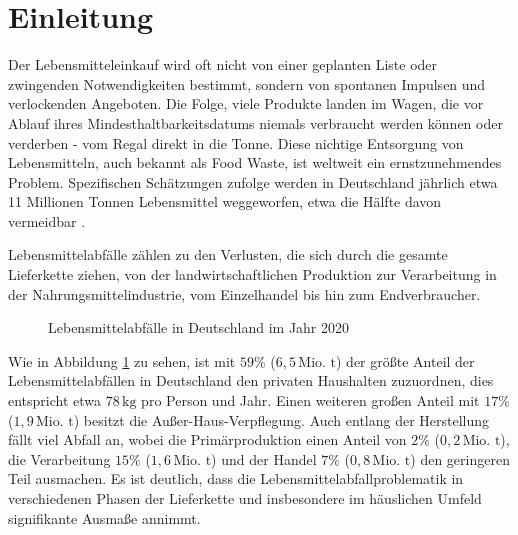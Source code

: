 \section{Einleitung}
Der Lebensmitteleinkauf wird oft nicht von einer geplanten Liste oder zwingenden Notwendigkeiten bestimmt, sondern von spontanen Impulsen und verlockenden Angeboten. Die Folge, viele Produkte landen im Wagen, die vor Ablauf ihres Mindesthaltbarkeitsdatums niemals verbraucht werden können oder verderben - vom Regal direkt in die Tonne. Diese nichtige Entsorgung von Lebensmitteln, auch bekannt als Food Waste, ist weltweit ein ernstzunehmendes Problem. Spezifischen Schätzungen zufolge werden in Deutschland jährlich etwa 11 Millionen Tonnen Lebensmittel weggeworfen, etwa die Hälfte davon vermeidbar \cite{Schmidt.2019}. 

Lebensmittelabfälle zählen zu den Verlusten, die sich durch die gesamte Lieferkette ziehen, von der landwirtschaftlichen Produktion zur Verarbeitung in der Nahrungsmittelindustrie, vom Einzelhandel bis hin zum Endverbraucher. 

\begin{figure}[h]
    \centering
    \caption[Lebensmittelabfälle in Deutschland im Jahr 2020]{Lebensmittelabfälle in Deutschland im Jahr 2020 \cite{StatistischesBundesamt.2022}}
    \label{fig:AnteilAbfälle}
\end{figure}
\FloatBarrier

Wie in Abbildung \ref{fig:AnteilAbfälle} zu sehen,  ist mit $59\%$ ($6,5\,\text{Mio. t}$) der größte Anteil der Lebensmittelabfällen in Deutschland den privaten Haushalten zuzuordnen, dies entspricht etwa $78\,\text{kg}$ pro Person und Jahr. Einen weiteren großen Anteil mit $17\%$ ($1,9\,\text{Mio. t}$) besitzt die Außer-Haus-Verpflegung. Auch entlang der Herstellung fällt viel Abfall an, wobei die Primärproduktion einen Anteil von $2\%$ ($0,2\,\text{Mio. t}$), die Verarbeitung $15\%$ ($1,6\,\text{Mio. t}$) und der Handel $7\%$ ($0,8\,\text{Mio. t}$) den geringeren Teil ausmachen. Es ist deutlich, dass die Lebensmittelabfallproblematik in verschiedenen Phasen der Lieferkette und insbesondere im häuslichen Umfeld signifikante Ausmaße annimmt.
 

